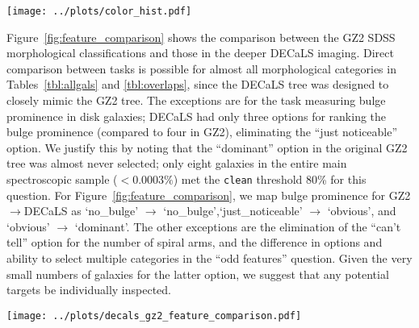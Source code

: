 \documentclass[iop,apj,tighten]{emulateapj}
\begin{document}
\begin{figure*}
\centering
\texttt{[image: ../plots/color\_hist.pdf]}
\caption{Histograms of the optical $(u-r)$ color distribution for various volume-limited and sample choices, separated by highly-confident $(p >= 0.8)$ morphological classifications into spiral and ellipticals. Galaxies with intermediate morphologies $(0.2 < p < 0.8)$ are not shown. \textbf{Top row}: GZ2 main spectroscopic sample. \textbf{Middle row}: Stripe~82 coadded. \textbf{Bottom row}: DECaLS. \label{fig:color_hist}}
\end{figure*}

Figure~\ref{fig:feature_comparison} shows the comparison between the GZ2 SDSS morphological classifications and those in the deeper DECaLS imaging. Direct comparison between tasks is possible for almost all morphological categories in Tables~\ref{tbl:allgals} and \ref{tbl:overlaps}, since the DECaLS tree was designed to closely mimic the GZ2 tree. The exceptions are for the task measuring bulge prominence in disk galaxies; DECaLS had only three options for ranking the bulge prominence (compared to four in GZ2), eliminating the ``just noticeable'' option. We justify this by noting that the ``dominant'' option in the original GZ2 tree was almost never selected; only eight galaxies in the entire main spectroscopic sample ($<0.0003\%$) met the \texttt{clean} threshold 80\% for this question. For Figure~\ref{fig:feature_comparison}, we map bulge prominence for GZ2$\rightarrow$DECaLS as `no\_bulge' $\rightarrow$ `no\_bulge',`just\_noticeable' $\rightarrow$ `obvious', and `obvious' $\rightarrow$ `dominant'. The other exceptions are the elimination of the ``can't tell'' option for the number of spiral arms, and the difference in options and ability to select multiple categories in the ``odd features'' question. Given the very small numbers of galaxies for the latter option, we suggest that any potential targets be individually inspected. 

\begin{figure*}
\centering
\texttt{[image: ../plots/decals\_gz2\_feature\_comparison.pdf]}
\caption{Comparison of the unweighted morphological vote fractions for the 12,267~galaxies in both DECaLS (x-axis) and GZ2 (y-axis). Colors are a log-histogram of the number of galaxies in each bin, normalized to the peak bin for each category. Each morphological category plots only galaxies for which the question was well-sampled (determined by plurality vote through the decision tree). The red dashed line shows the one-to-one correspondence.\label{fig:feature_comparison}}
\end{figure*}
\end{document}
